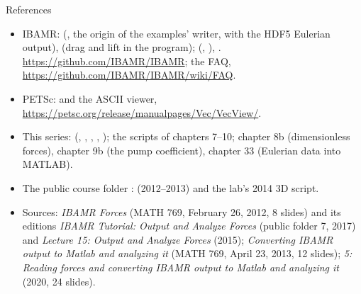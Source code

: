 \documentclass[aspectratio=169,11pt]{beamer}
\begin{document}
\begin{frame}{References}
\label{fr:refs}
\scriptsize
\begin{itemize}
  \item IBAMR:  (, the origin of the examples' writer, with the HDF5 Eulerian output),  (drag and lift in the program);  (, ), . \url{https://github.com/IBAMR/IBAMR}; the FAQ, \url{https://github.com/IBAMR/IBAMR/wiki/FAQ}.
  \item PETSc:  and the ASCII viewer, \url{https://petsc.org/release/manualpages/Vec/VecView/}.
  \item This series:  (, , , , ); the  scripts of chapters 7--10; chapter 8b (dimensionless forces), chapter 9b (the pump coefficient), chapter 33 (Eulerian data into MATLAB).
  \item The public course folder :  (2012--2013) and the lab's 2014 3D script.
  \item Sources: \emph{IBAMR Forces} (MATH 769, February 26, 2012, 8 slides) and its editions \emph{IBAMR Tutorial: Output and Analyze Forces} (public folder 7, 2017) and \emph{Lecture 15: Output and Analyze Forces} (2015); \emph{Converting IBAMR output to Matlab and analyzing it} (MATH 769, April 23, 2013, 12 slides); \emph{5: Reading forces and converting IBAMR output to Matlab and analyzing it} (2020, 24 slides).
\end{itemize}
\end{frame}
\end{document}
